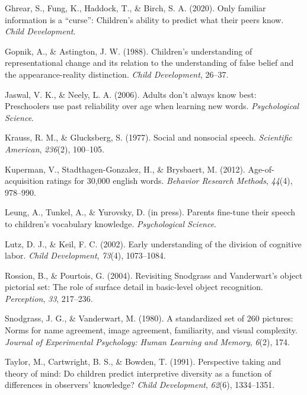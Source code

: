 \documentclass[10pt, letterpaper]{article}
\newenvironment{CSLReferences}%
  {}%
  {\par}
\begin{document}
\begin{CSLReferences}{1}{0}
\leavevmode\hypertarget{ref-ghrear2020}{}%
Ghrear, S., Fung, K., Haddock, T., \& Birch, S. A. (2020). Only familiar
information is a {``curse''}: Children's ability to predict what their
peers know. \emph{Child Development}.

\leavevmode\hypertarget{ref-gopnik1988}{}%
Gopnik, A., \& Astington, J. W. (1988). Children's understanding of
representational change and its relation to the understanding of false
belief and the appearance-reality distinction. \emph{Child Development},
26--37.

\leavevmode\hypertarget{ref-jaswal2006}{}%
Jaswal, V. K., \& Neely, L. A. (2006). Adults don't always know best:
Preschoolers use past reliability over age when learning new words.
\emph{Psychological Science}.

\leavevmode\hypertarget{ref-krauss1977}{}%
Krauss, R. M., \& Glucksberg, S. (1977). Social and nonsocial speech.
\emph{Scientific American}, \emph{236}(2), 100--105.

\leavevmode\hypertarget{ref-kuperman2012}{}%
Kuperman, V., Stadthagen-Gonzalez, H., \& Brysbaert, M. (2012).
Age-of-acquisition ratings for 30,000 english words. \emph{Behavior
Research Methods}, \emph{44}(4), 978--990.

\leavevmode\hypertarget{ref-leung2021}{}%
Leung, A., Tunkel, A., \& Yurovsky, D. (in press). Parents fine-tune
their speech to children's vocabulary knowledge. \emph{Psychological
Science}.

\leavevmode\hypertarget{ref-lutz2002}{}%
Lutz, D. J., \& Keil, F. C. (2002). Early understanding of the division
of cognitive labor. \emph{Child Development}, \emph{73}(4), 1073--1084.

\leavevmode\hypertarget{ref-rossion2004}{}%
Rossion, B., \& Pourtois, G. (2004). {Revisiting Snodgrass and
Vanderwart's object pictorial set: The role of surface detail in
basic-level object recognition}. \emph{Perception}, \emph{33}, 217--236.

\leavevmode\hypertarget{ref-snodgrass1980}{}%
Snodgrass, J. G., \& Vanderwart, M. (1980). A standardized set of 260
pictures: Norms for name agreement, image agreement, familiarity, and
visual complexity. \emph{Journal of Experimental Psychology: Human
Learning and Memory}, \emph{6}(2), 174.

\leavevmode\hypertarget{ref-taylor1991}{}%
Taylor, M., Cartwright, B. S., \& Bowden, T. (1991). Perspective taking
and theory of mind: Do children predict interpretive diversity as a
function of differences in observers' knowledge? \emph{Child
Development}, \emph{62}(6), 1334--1351.


\end{CSLReferences}
\end{document}
